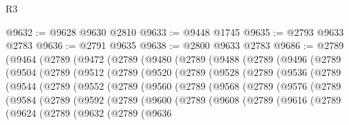 \begin{lexlean}{R3}
\begin{coremodule}
@9632 := @9628 @9630 @2810
@9633 := @9448 @1745
@9635 := @2793 @9633 @2783
@9636 := @2791 @9635
@9638 := @2800 @9633 @2783
@9686 := @2789
    (@9464
      (@2789
        (@9472
          (@2789
            (@9480
              (@2789
                (@9488
                  (@2789
                    (@9496
                      (@2789
                        (@9504
                          (@2789
                            (@9512
                              (@2789
                                (@9520
                                  (@2789
                                    (@9528
                                      (@2789
                                        (@9536
                                          (@2789
                                            (@9544
                                              (@2789
                                                (@9552
                                                  (@2789
                                                    (@9560
                                                      (@2789
                                                        (@9568
                                                          (@2789
                                                            (@9576
                                                              (@2789
                                                                (@9584
                                                                  (@2789
                                                                    (@9592
                                                                      (@2789
                                                                        (@9600
                                                                          (@2789
                                                                            (@9608
                                                                              (@2789
                                                                                (@9616
                                                                                  (@2789
                                                                                    (@9624
                                                                                      (@2789
                                                                                        (@9632
                                                                                          (@2789
                                                                                            (@9636

\end{coremodule}
\end{lexlean}

